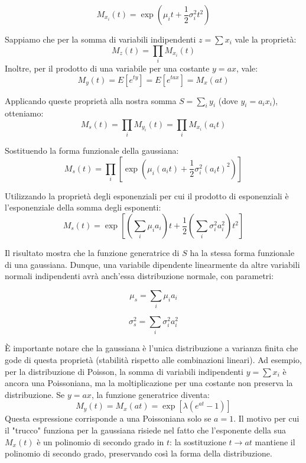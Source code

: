 \documentclass{article}
\theoremstyle{remark}
\begin{document}
\begin{equation}
M_{x_i}(t) = \exp \left( \mu_i t + \frac{1}{2} \sigma_i^2 t^2 \right)
\end{equation}

Sappiamo che per la somma di variabili indipendenti $z = \sum x_i$ vale la proprietà:
\begin{equation}
M_z(t) = \prod_{i} M_{x_i}(t)  
\end{equation}
Inoltre, per il prodotto di una variabile per una costante $y = ax$, vale:
\begin{equation}
M_y(t) = E[e^{t y}] = E[e^{tax}] = M_x(at) 
\end{equation}

Applicando queste proprietà alla nostra somma $S = \sum_{i} y_i$ (dove $y_i = a_i x_i$), otteniamo:
\begin{equation}
M_s(t) = \prod_{i} M_{y_i}(t) = \prod_{i} M_{x_i}(a_i t)
\end{equation}

Sostituendo la forma funzionale della gaussiana:
\begin{equation}
M_s(t) = \prod_{i} \left[ \exp \left( \mu_i (a_i t) + \frac{1}{2} \sigma_i^2 (a_i t)^2 \right) \right]
\end{equation}

Utilizzando la proprietà degli esponenziali per cui il prodotto di esponenziali è l'esponenziale della somma degli esponenti:
\begin{equation}
M_s(t) = \exp \left[ \left(\sum_{i} \mu_i a_i\right) t + \frac{1}{2} \left( \sum_{i} \sigma_i^2 a_i^2 \right) t^2 \right]
\end{equation}

Il risultato mostra che la funzione generatrice di $S$ ha la stessa forma funzionale di una gaussiana. Dunque, una variabile dipendente linearmente da altre variabili normali indipendenti avrà anch'essa distribuzione normale, con parametri:

\begin{equation}
\mu_s = \sum_{i} \mu_i a_i
\end{equation}

\begin{equation}
\sigma_s^2 = \sum_{i} \sigma_i^2 a_i^2
\end{equation}

È importante notare che la gaussiana è l'unica distribuzione a varianza finita che gode di questa proprietà (stabilità rispetto alle combinazioni lineari).
Ad esempio, per la distribuzione di Poisson, la somma di variabili indipendenti $y = \sum x_i$ è ancora una Poissoniana, ma la moltiplicazione per una costante non preserva la distribuzione. Se $y=ax$, la funzione generatrice diventa:
\begin{equation}
M_y(t) = M_x(at) = \exp [\lambda (e^{at} - 1)]
\end{equation}
Questa espressione corrisponde a una Poissoniana solo se $a=1$.
Il motivo per cui il "trucco" funziona per la gaussiana risiede nel fatto che l'esponente della sua $M_x(t)$ è un polinomio di secondo grado in $t$: la sostituzione $t \to at$ mantiene il polinomio di secondo grado, preservando così la forma della distribuzione.
\end{document}
